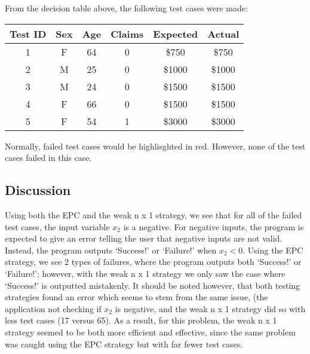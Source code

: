 From the decision table above, the following test cases were made:
\vspace{20pt}

\begin{adjustbox}{center}
	\begin{tabular}{cccccc}
		Test ID & Sex & Age & Claims & Expected & Actual \\ \hline
		1       & F   & 64  & 0      & \$750    & \$750  \\
		2       & M   & 25  & 0      & \$1000   & \$1000 \\
		3       & M   & 24  & 0      & \$1500   & \$1500 \\
		4       & F   & 66  & 0      & \$1500   & \$1500 \\
		5       & F   & 54  & 1      & \$3000   & \$3000 \\
	\end{tabular}%
\end{adjustbox}
Normally, failed test cases would be highlisghted in red. However, none of the
test cases failed in this case.

\subsection{Discussion}
Using both the EPC and the weak n x 1 strategy, we see that for all of the
failed test cases, the input variable $x_2$ is a negative. For negative
inputs, the program is expected to give an error telling the user that
negative inputs are not valid. Instead, the program outputs `Success!'
or `Failure!' when $x_2 < 0$. Using the EPC strategy, we see
2 types of failures, where the program outputs both `Success!'
or `Failure!'; however, with the weak n x 1 strategy we only saw the case where
`Success!' is outputted mistakenly. It should be noted however, that both
testing strategies found an error which seems to stem from the same issue,
(the application not checking if $x_2$ is negative, and the weak n x 1 strategy
did so with less test cases (17 versus 65). As a result, for this problem,
the weak n x 1 strategy seemed to be both more efficient and effective,
since the same problem was caught using the EPC strategy but with far fewer
test cases. 
